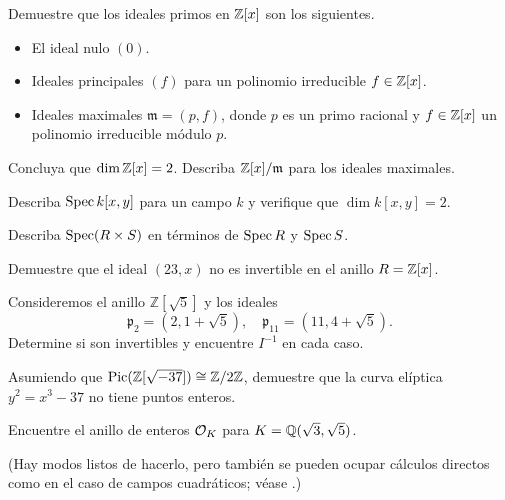 \begin{ejercicio}
  Demuestre que los ideales primos en $\mathbb{Z} [x]$ son los siguientes.

  \begin{itemize}
  \item El ideal nulo $(0)$.

  \item Ideales principales $(f)$ para un polinomio irreducible $f \in \mathbb{Z} [x]$.

  \item Ideales maximales $\mathfrak{m} = (p,f)$, donde $p$ es un primo racional
    y $f \in \mathbb{Z} [x]$ un polinomio irreducible módulo $p$.
  \end{itemize}

  Concluya que $\dim \mathbb{Z} [x] = 2$. Describa $\mathbb{Z} [x]/\mathfrak{m}$ para los
  ideales maximales.
\end{ejercicio}

\begin{ejercicio}
  Describa $\operatorname{Spec} k [x,y]$ para un campo $k$ y verifique que $\dim k [x,y] = 2$.
\end{ejercicio}

\begin{ejercicio}
  Describa $\operatorname{Spec} (R\times S)$ en términos de $\operatorname{Spec} R$ y $\operatorname{Spec} S$.
\end{ejercicio}

\begin{ejercicio}
  Demuestre que el ideal $(23,x)$ no es invertible en el anillo $R = \mathbb{Z} [x]$.
\end{ejercicio}

\begin{ejercicio}
  Consideremos el anillo $\mathbb{Z} [\sqrt{5}]$ y los ideales
  \[ \mathfrak{p}_2 = (2, 1 + \sqrt{5}), \quad
     \mathfrak{p}_{11} = (11, 4 + \sqrt{5}). \]
  Determine si son invertibles y encuentre $I^{-1}$ en cada caso.
\end{ejercicio}

\begin{ejercicio}
  Asumiendo que $\operatorname{Pic} (\mathbb{Z} [\sqrt{-37}]) \cong \mathbb{Z}/2\mathbb{Z}$,
  demuestre que la curva elíptica $y^2 = x^3 - 37$ no tiene puntos enteros.
\end{ejercicio}

\begin{ejercicio}
  Encuentre el anillo de enteros $\mathcal{O}_K$ para $K = \mathbb{Q} (\sqrt{3},\sqrt{5})$.

  (Hay modos listos de hacerlo, pero también se pueden ocupar cálculos directos
  como en el caso de campos cuadráticos; véase \cite{Williams-1970}.)
\end{ejercicio}

